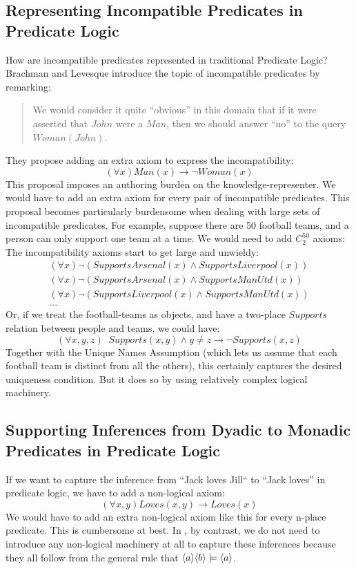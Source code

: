 \subsection{Representing Incompatible Predicates in Predicate Logic}
\label{incompatiblepredicatesinfol}
How are incompatible predicates represented in traditional Predicate Logic?
Brachman and Levesque\cite{brachman} introduce the topic of incompatible predicates by remarking:
\begin{quote}
We would consider it quite ``obvious'' in this domain that if it were asserted that $John$ were a $Man$, then we should answer ``no'' to the query $Woman(John)$.
\end{quote}
They propose adding an extra axiom to express the incompatibility:
\[
(\forall x) Man(x) \rightarrow \neg Woman(x)
\]   
This proposal imposes an authoring burden on the knowledge-representer.
We would have to add an extra axiom for every pair of incompatible predicates.
This proposal becomes particularly burdensome when dealing with large sets of incompatible predicates. 
For example, suppose there are 50 football teams, and a person can only support one team at a time. 
We would need to add $C^{50}_2$ axioms:
The incompatibility axioms start to get large and unwieldy:
\begin{eqnarray}
(\forall x) \neg (SupportsArsenal(x) \land SupportsLiverpool(x)) \nonumber \\
(\forall x) \neg (SupportsArsenal(x) \land SupportsManUtd(x)) \nonumber \\
(\forall x) \neg (SupportsLiverpool(x) \land SupportsManUtd(x)) \nonumber \\
... \nonumber
\end{eqnarray}   
Or, if we treat the football-teams as objects, and have a two-place $Supports$ relation between people and teams, we could have:
\[
(\forall x,y,z) \; \; Supports(x,y) \land y \neq z \rightarrow \neg Supports(x,z)
\]   
Together with the Unique Names Assumption (which lets us assume that each football team is distinct from all the others), this certainly captures the desired uniqueness condition.
But it does so by using relatively complex logical machinery.

\subsection{Supporting Inferences from Dyadic to Monadic Predicates in Predicate Logic}
If we want to capture the inference from ``Jack loves Jill`` to ``Jack loves'' in predicate logic, we have to add a non-logical axiom:
\[
(\forall x, y) Loves(x,y) \rightarrow Loves(x)
\]
We would have to add an extra non-logical axiom like this for every n-place predicate.
This is cumbersome at best. 
In \ELABR{}, by contrast, we do not need to introduce any non-logical machinery at all to capture these inferences because they all follow from the general rule that $\MAY{a} \MAY{b} \models \MAY{a}$.

